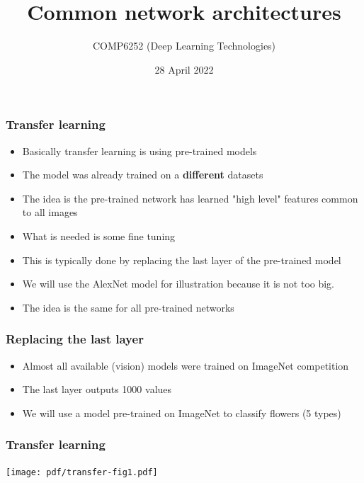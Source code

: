 \documentclass{beamer}
\begin{document}
\title{Common network architectures}
\author{COMP6252 (Deep Learning Technologies)}
 \date{28 April 2022}
 \date{}
\begin{frame}
    \placelogofalse %
    \titlepage
\end{frame}
    
\placelogotrue
\begin{frame}
	\frametitle{Transfer learning}
\begin{itemize}
	
\item  Basically transfer learning is using pre-trained models
\item The model was already trained on a \textbf{different} datasets
\item The idea is the pre-trained network has learned "high level" features common to all images
\item  What is needed is some fine tuning
\item This is typically done by replacing the last layer of the pre-trained model
\item We will use the AlexNet model for illustration because it is not too big.
\item The idea is the same for all pre-trained networks
\end{itemize}
\end{frame}

\begin{frame}
    \frametitle{Replacing the last layer}
\begin{itemize}
    \item Almost all available (vision) models were trained on ImageNet competition
    \item The last layer outputs 1000 values
    \item We will use a model pre-trained on ImageNet to classify flowers (5 types)
\end{itemize}
\end{frame}


\begin{frame}
    \frametitle{Transfer learning}
\begin{center}
    \texttt{[image: pdf/transfer-fig1.pdf]}
\end{center}
\end{frame}
\end{document}
